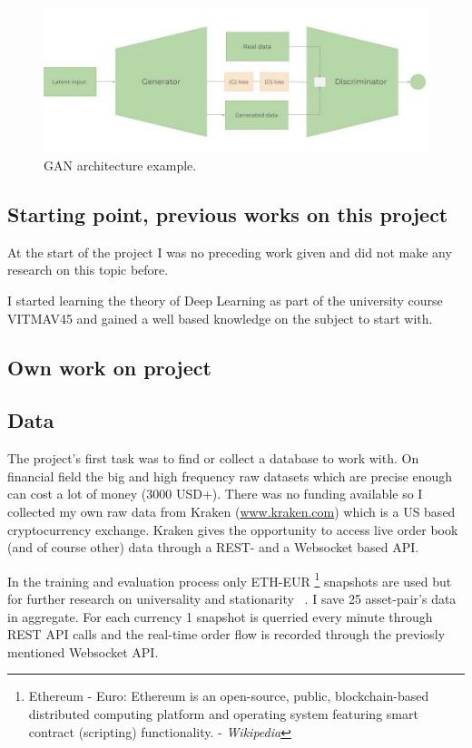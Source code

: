 \documentclass[11pt,a4paper,oneside]{article}
\begin{document}
  \begin{figure}[tbh]
    \centering
    \includegraphics[width=12cm]{gan.jpg}
    \caption{GAN architecture example.}
    \label{fig:3}
  \end{figure}

\subsection{Starting point, previous works on this project}
\label{sec:prev_works}

At the start of the project I was no preceding work given and did not make any research on this topic before.

I started learning the theory of Deep Learning as part of the university course VITMAV45 and gained a well based 
knowledge on the subject to start with.

\newpage
\begin{center}
  \section{Own work on project}
  \label{sec:work}
\end{center}

\subsection{Data}
\label{sec:data}

The project's first task was to find or collect a database to work with. On financial field the big and high frequency 
raw datasets which are precise enough can cost a lot of money (3000 USD+). There was no funding available so I collected 
my own raw data from Kraken (\url{www.kraken.com}) which is a US based cryptocurrency exchange. Kraken gives the 
opportunity to access live order book (and of course other) data through a REST- and a Websocket based API. 

In the training and evaluation process only ETH-EUR \footnote{Ethereum - Euro: Ethereum is an open-source, public, 
blockchain-based distributed computing platform and operating system featuring smart contract (scripting) functionality. 
- \textit{Wikipedia} } snapshots are used but for further research on universality and stationarity ~\cite{univ}. I save 
25 asset-pair's data in aggregate. For each currency 1 snapshot is querried every minute through REST API calls and the 
real-time order flow is recorded through the previosly mentioned Websocket API.  
\end{document}
